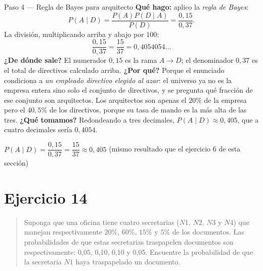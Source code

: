\documentclass[11pt]{article}
\begin{document}
\begin{sol}
\begin{paso}{Paso 4 --- Regla de Bayes para arquitecto}
\textbf{Qué hago:} aplico la \emph{regla de Bayes}:
\[
P(A\mid D)=\frac{P(A)P(D\mid A)}{P(D)}=\frac{0,15}{0,37}.
\]
La división, multiplicando arriba y abajo por $100$:
\[
\frac{0,15}{0,37}=\frac{15}{37}=0,4054054\ldots
\]
\textbf{¿De dónde sale?} El numerador $0,15$ es la rama $A\to D$; el denominador $0,37$ es el total de directivos calculado arriba.
\textbf{¿Por qué?} Porque el enunciado condiciona a \emph{un empleado directivo elegido al azar}: el universo ya no es la empresa entera sino solo el conjunto de directivos, y se pregunta qué fracción de ese conjunto son arquitectos. Los arquitectos son apenas el $20\%$ de la empresa pero el $40,5\%$ de los directivos, porque su tasa de mando es la más alta de las tres.
\textbf{¿Qué tomamos?} Redondeando a tres decimales, $P(A\mid D)\approx 0,405$, que a cuatro decimales sería $0,4054$.
\end{paso}

\begin{resp}
$P(A\mid D)=\dfrac{0,15}{0,37}=\dfrac{15}{37}\approx 0,405$ \quad (mismo resultado que el ejercicio 6 de esta sección)
\end{resp}

\end{sol}

\newpage
\section*{Ejercicio 14}

\begin{quote}
Suponga que una oficina tiene cuatro secretarias ($N1$, $N2$, $N3$ y $N4$) que manejan respectivamente $20\%$, $60\%$, $15\%$ y $5\%$ de los documentos. Las probabilidades de que estas secretarias traspapelen documentos son respectivamente: 0,05, 0,10, 0,10 y 0,05. Encuentre la probabilidad de que la secretaria $N1$ haya traspapelado un documento.
\end{quote}
\end{document}
